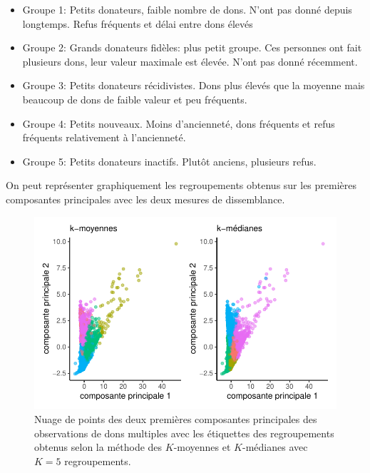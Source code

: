 \documentclass[
  11pt,
  letterpaper,
]{scrbook}
\providecommand{\tightlist}{%
  \setlength{\itemsep}{0pt}\setlength{\parskip}{0pt}}\usepackage{longtable,booktabs,array}
\theoremstyle{definition}
\theoremstyle{remark}
\begin{document}
\begin{itemize}
\tightlist
\item
  Groupe 1: Petits donateurs, faible nombre de dons. N'ont pas donné
  depuis longtemps. Refus fréquents et délai entre dons élevés
\item
  Groupe 2: Grands donateurs fidèles: plus petit groupe. Ces personnes
  ont fait plusieurs dons, leur valeur maximale est élevée. N'ont pas
  donné récemment.
\item
  Groupe 3: Petits donateurs récidivistes. Dons plus élevés que la
  moyenne mais beaucoup de dons de faible valeur et peu fréquents.
\item
  Groupe 4: Petits nouveaux. Moins d'ancienneté, dons fréquents et refus
  fréquents relativement à l'ancienneté.
\item
  Groupe 5: Petits donateurs inactifs. Plutôt anciens, plusieurs refus.
\end{itemize}

On peut représenter graphiquement les regroupements obtenus sur les
premières composantes principales avec les deux mesures de dissemblance.

\begin{figure}[ht!]

{\centering \includegraphics{regroupements_files/figure-pdf/fig-acpkmoy5-1.pdf}

}

\caption{\label{fig-acpkmoy5}Nuage de points des deux premières
composantes principales des observations de dons multiples avec les
étiquettes des regroupements obtenus selon la méthode des \(K\)-moyennes
et \(K\)-médianes avec \(K=5\) regroupements.}

\end{figure}
\end{document}

